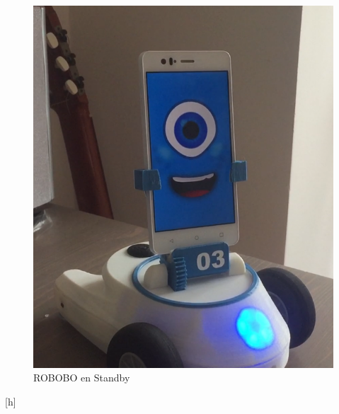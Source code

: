 \begin{figure}[h]
\begin{minipage}{0.45\textwidth}
\end{minipage}\hfill
\begin{minipage}{0.45\textwidth}
\centering
\includegraphics[width=1\linewidth]{imagenes/simon_smile.png}

\caption{ROBOBO en Standby}
\label{fig:simon-smile}

\end{minipage}
\end{figure}[h]

